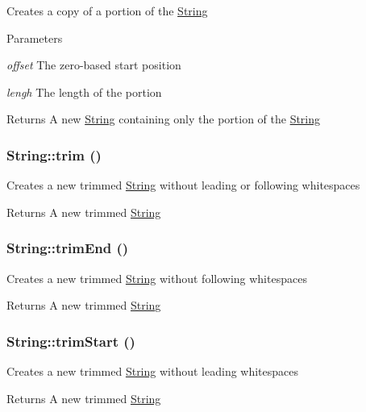 \label{classString_a23eb86e0ad225b29dd3e02e637a42c37}
Creates a copy of a portion of the \hyperlink{classString}{String} 
\begin{DoxyParams}{Parameters}
\item[{\em offset}]The zero-\/based start position \item[{\em lengh}]The length of the portion \end{DoxyParams}
\begin{DoxyReturn}{Returns}
A new \hyperlink{classString}{String} containing only the portion of the \hyperlink{classString}{String} 
\end{DoxyReturn}
\hypertarget{classString_ac3a075e35b0f39698230957bc7d0172d}{
\subsubsection[{trim}]{\setlength{\rightskip}{0pt plus 5cm}String::trim ()}}
\label{classString_ac3a075e35b0f39698230957bc7d0172d}
Creates a new trimmed \hyperlink{classString}{String} without leading or following whitespaces \begin{DoxyReturn}{Returns}
A new trimmed \hyperlink{classString}{String} 
\end{DoxyReturn}
\hypertarget{classString_a316e68c5acc7716e4aac01c78a1b5063}{
\subsubsection[{trimEnd}]{\setlength{\rightskip}{0pt plus 5cm}String::trimEnd ()}}
\label{classString_a316e68c5acc7716e4aac01c78a1b5063}
Creates a new trimmed \hyperlink{classString}{String} without following whitespaces \begin{DoxyReturn}{Returns}
A new trimmed \hyperlink{classString}{String} 
\end{DoxyReturn}
\hypertarget{classString_a34b1f94648606639f31a7596445ff52e}{
\subsubsection[{trimStart}]{\setlength{\rightskip}{0pt plus 5cm}String::trimStart ()}}
\label{classString_a34b1f94648606639f31a7596445ff52e}
Creates a new trimmed \hyperlink{classString}{String} without leading whitespaces \begin{DoxyReturn}{Returns}
A new trimmed \hyperlink{classString}{String} 
\end{DoxyReturn}

